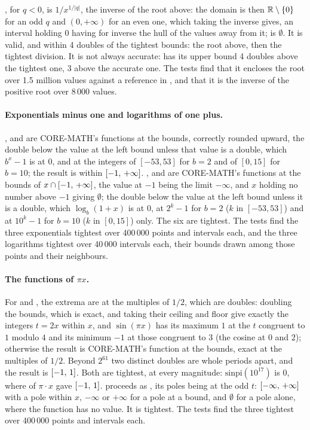 , for $q<0$, is $1/x^{1/|q|}$, the inverse of the
root above: the domain is then $\mathbb{R}\setminus\{0\}$ for an odd $q$ and
$(0, +\infty)$ for an even one, which taking the inverse gives, an interval
holding $0$ having for inverse the hull of the values away from it;
 is $\emptyset$.\newinvfive{} It is valid, and within 4 doubles of the tightest bounds: the root above, then the tightest division. It is not always accurate:  has its upper bound 4 doubles above the tightest one, 3 above the accurate one. The tests find that it encloses the root over 1.5 million
values against a reference in , and that it is the
inverse of the positive root over 8\,000 values.

\paragraph{Exponentials minus one and logarithms of one plus.}
,  and  are CORE-MATH's
functions at the bounds, correctly rounded upward, the double below the
value at the left bound unless that value is a double, which $b^x-1$ is at
$0$, and at the integers of $[-53, 53]$ for $b=2$ and of $[0, 15]$ for
$b=10$; the result is within $[-1,\,+\infty]$.\newinvfive{}
,  and  are CORE-MATH's
functions at the bounds of $x\cap[-1,\,+\infty]$, the value at $-1$
being the limit $-\infty$, and $x$ holding no number above $-1$ giving
$\emptyset$; the double below the value at the left bound unless it is a
double, which $\log_b(1+x)$ is at $0$, at $2^k-1$ for $b=2$ ($k$ in
$[-53, 53]$) and at $10^k-1$ for $b=10$ ($k$ in $[0, 15]$)
only.\newinvfive{} The six are tightest. The tests find the three
exponentials tightest over 400\,000 points and intervals each, and the
three logarithms tightest over 40\,000 intervals each, their bounds drawn
among those points and their neighbours.

\paragraph{The functions of $\pi x$.}
For  and , the extrema are at the multiples
of $1/2$, which are doubles: doubling the bounds, which is exact, and
taking their ceiling and floor give exactly the integers $t=2x$ within $x$,
and $\sin(\pi x)$ has its maximum $1$ at the $t$ congruent to $1$ modulo
$4$ and its minimum $-1$ at those congruent to $3$ (the cosine at $0$ and
$2$); otherwise the result is CORE-MATH's function at the bounds, exact at
the multiples of $1/2$. Beyond $2^{61}$ two distinct doubles are whole
periods apart, and the result is $[-1,\,1]$.\newinvfive{} Both are
tightest, at every magnitude: $\mathrm{sinpi}(10^{17})$ is $0$, where
 of $\pi\cdot x$ gave $[-1,\,1]$.  proceeds as
, its poles being at the odd $t$: $[-\infty,\,+\infty]$
with a pole within $x$, $-\infty$ or $+\infty$ for a pole at a bound, and
$\emptyset$ for a pole alone, where the function has no
value.\newinvfive{} It is tightest. The tests find the three tightest over
400\,000 points and intervals each.

